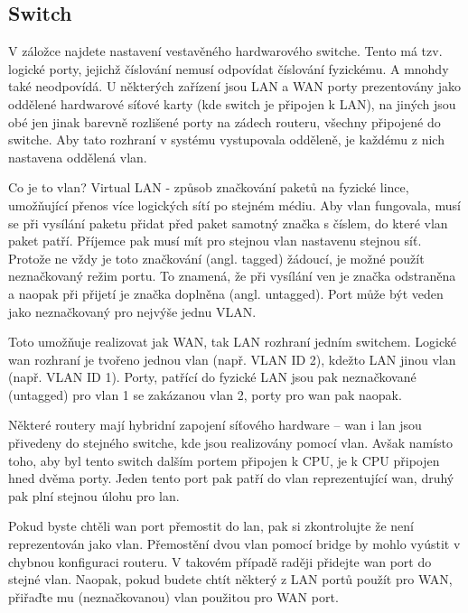 \subsection{Switch}
\label{net:switch}
V záložce  najdete nastavení vestavěného
hardwarového switche. Tento má tzv. logické porty, jejichž číslování nemusí
odpovídat číslování fyzickému. A mnohdy také neodpovídá. U některých zařízení
jsou LAN a WAN porty prezentovány jako oddělené hardwarové síťové karty
(kde switch je připojen k LAN), na jiných jsou obé jen jinak barevně rozlišené
porty na zádech routeru, všechny připojené do switche. Aby tato rozhraní v
systému vystupovala odděleně, je každému z nich nastavena oddělená \gls{vlan}.


Co je to \gls{vlan}? Virtual LAN - způsob značkování
paketů na fyzické lince, umožňující přenos více logických sítí po stejném
médiu. Aby \gls{vlan} fungovala, musí se při vysílání paketu přidat před
paket samotný značka s číslem, do které \gls{vlan} paket patří. Příjemce
pak musí mít pro stejnou \gls{vlan} nastavenu stejnou síť. Protože ne vždy
je toto značkování (angl. tagged) žádoucí, je možné použít neznačkovaný režim
portu. To znamená, že při vysílání ven je značka odstraněna a naopak při
přijetí je značka doplněna (angl. untagged). Port může být veden jako neznačkovaný
pro nejvýše jednu VLAN.

Toto umožňuje realizovat jak WAN, tak LAN rozhraní jedním switchem. Logické
\gls{wan} rozhraní je tvořeno jednou \gls{vlan} (např. VLAN ID 2), kdežto
LAN jinou \gls{vlan} (např. VLAN ID 1). Porty, patřící do fyzické LAN jsou
pak neznačkované (untagged) pro \gls{vlan} 1 se zakázanou \gls{vlan} 2, porty
pro \gls{wan} pak naopak.

Některé routery mají hybridní zapojení síťového hardware -- \gls{wan} i
\gls{lan} jsou přivedeny do stejného switche, kde jsou realizovány pomocí \gls{vlan}.
Avšak namísto toho, aby byl tento switch dalším portem připojen k CPU, je k CPU
připojen hned dvěma porty. Jeden tento port pak patří do \gls{vlan} reprezentující
\gls{wan}, druhý pak plní stejnou úlohu pro \gls{lan}.

Pokud byste chtěli \gls{wan} port přemostit do \gls{lan}, pak si zkontrolujte
že není reprezentován jako \gls{vlan}. Přemostění dvou vlan pomocí bridge
by mohlo vyústit v chybnou konfiguraci routeru. V takovém případě raději přidejte
\gls{wan} port do stejné \gls{vlan}. Naopak, pokud budete chtít některý z LAN
portů použít pro WAN, přiřaďte mu (neznačkovanou) \gls{vlan} použitou pro WAN
port.

